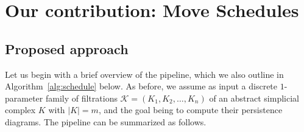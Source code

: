 \documentclass{siamart190516}
\begin{document}

\section{Our contribution: Move Schedules}\label{sec:move_schedules}
%

\subsection{Proposed approach}
Let us begin with a brief overview of the pipeline, which we also outline in Algorithm~\ref{alg:schedule} below.
As before, we assume as input  a discrete $1$-parameter family of filtrations $\mathcal{K} = (K_1, K_2, \dots, K_n)$ of an abstract simplicial complex $K$ with $|K|=m$, 
and the goal being to compute their persistence diagrams.
The pipeline can be summarized as follows.
\end{document}
